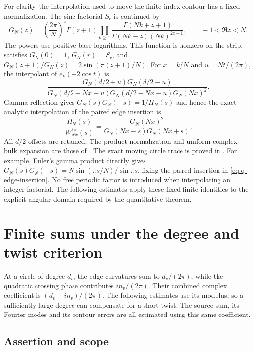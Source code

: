 For clarity, the interpolation used to move the finite index contour
has a fixed normalization. The sine factorial $S_r$ is continued by
\begin{equation}\label{eq:q-gamma-definition}
 G_N(z)=\left(\frac{2\pi}{N}\right)^z\Gamma(z+1)
 \prod_{k\ge1}\frac{\Gamma(Nk+z+1)}
 {\Gamma(Nk-z)(Nk)^{2z+1}},\qquad -1<\Re z<N.
\end{equation}
The powers use positive-base logarithms. This function is nonzero on
the strip, satisfies $G_N(0)=1$, $G_N(r)=S_r$, and
$G_N(z+1)/G_N(z)=2\sin(\pi(z+1)/N)$. For $x=k/N$ and
$u=Nt/(2\pi)$, the interpolant of $e_k(-2\cos t)$ is
\begin{equation}\label{eq:q-edge-interpolation}
 \frac{G_N(d/2+u)G_N(d/2-u)}
 {G_N(d/2-Nx+u)G_N(d/2-Nx-u)G_N(Nx)^2}.
\end{equation}
Gamma reflection gives $G_N(s)G_N(-s)=1/H_N(s)$ and hence the exact
analytic interpolation of the paired edge insertion is
\begin{equation}\label{eq:q-edge-insertion}
 \frac{H_N(s)}{W^{\mathrm{hol}}_{Nx}(s)}
 =\frac{G_N(Nx)^2}{G_N(Nx-s)G_N(Nx+s)}.
\end{equation}
All $d/2$ offsets are retained. The product normalization and uniform complex bulk expansion are
those of \cite[Lemma~2.1]{ConwayAsymptotics}. The exact moving
circle trace is proved in \cite[Proposition~6.1 and Section~6]{MeridianTangles}.
For example, Euler's gamma product directly gives
$G_N(s)G_N(-s)=N\sin(\pi s/N)/\sin\pi s$, fixing the paired
insertion in \eqref{eq:q-edge-insertion}. No free periodic factor
is introduced when interpolating an integer factorial.
The following estimates apply these fixed finite identities to the
explicit angular domain required by the quantitative theorem.

\section{Finite sums under the degree and twist criterion}\label{sec:qe}

At a circle of degree $d_v$, the edge curvatures sum to
$d_v/(2\pi)$, while the quadratic crossing phase contributes
$in_v/(2\pi)$. Their combined complex coefficient is
$(d_v-in_v)/(2\pi)$. The following estimates use its modulus,
so a sufficiently large degree can compensate for a short twist.
The source sum, its Fourier modes and its contour errors are all
estimated using this same coefficient.

\subsection{Assertion and scope}\label{sec:qe-1}

